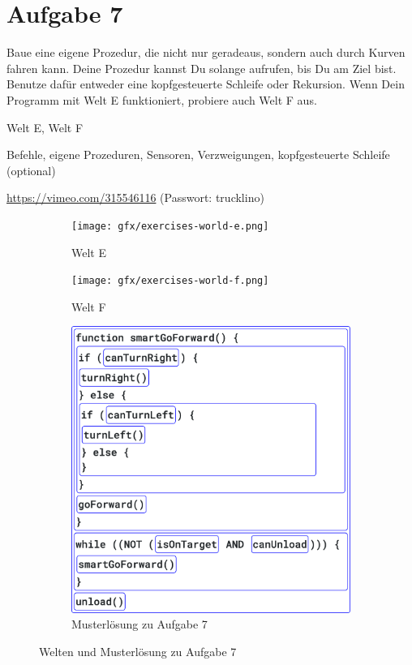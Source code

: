 \pagebreak

\section*{Aufgabe 7}
\label{sec:exercises:7}

Baue eine eigene Prozedur, die nicht nur geradeaus, sondern auch durch Kurven fahren kann. Deine Prozedur kannst Du solange aufrufen, bis Du am Ziel bist. Benutze dafür entweder eine kopfgesteuerte Schleife oder Rekursion. Wenn Dein Programm mit Welt E funktioniert, probiere auch Welt F aus.

\begin{description}[noitemsep]
  \item[Welt wählen:] Welt E, Welt F
  \item[Du brauchst:] Befehle, eigene Prozeduren, Sensoren, Verzweigungen, kopfgesteuerte Schleife (optional)
  \item[Video:] \url{https://vimeo.com/315546116} (Passwort: trucklino)
\end{description}

\begin{figure}[H]
  \begin{subfigure}[b]{0.40\textwidth}
    \texttt{[image: gfx/exercises-world-e.png]}
    \caption{Welt E}
  \end{subfigure}\hfill
  \vspace{0.5cm}
  \begin{subfigure}[b]{0.40\textwidth}
    \texttt{[image: gfx/exercises-world-f.png]}
    \caption{Welt F}
  \end{subfigure}
  \vspace{0.5cm}
  \begin{subfigure}[b]{0.40\textwidth}
    \includegraphics[width=\textwidth]{gfx/exercises-program-7.png}
    \caption{Musterlösung zu Aufgabe 7}
  \end{subfigure}
  \caption{Welten und Musterlösung zu Aufgabe 7}
\end{figure}

